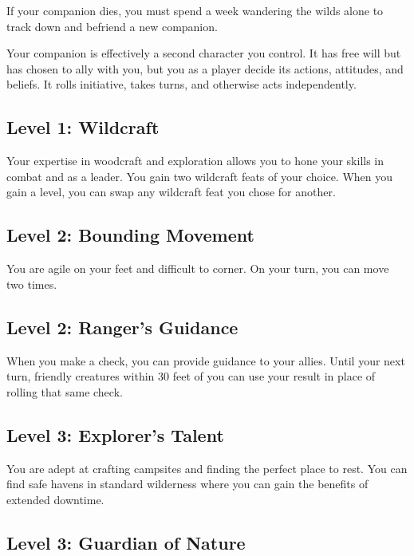 \documentclass[12pt,letterpaper,twocolumn,openany,nodeprecatedcode,bg=none]{dndbook}
\begin{document}
If your companion dies, you must spend a week wandering the wilds alone
to track down and befriend a new companion.

Your companion is effectively a second character you control. It has
free will but has chosen to ally with you, but you as a player decide
its actions, attitudes, and beliefs. It rolls initiative, takes turns,
and otherwise acts independently.

\subsection{Level 1: Wildcraft}\label{level-1-wildcraft}

Your expertise in woodcraft and exploration allows you to hone your
skills in combat and as a leader. You gain two wildcraft feats of your
choice. When you gain a level, you can swap any wildcraft feat you chose
for another.

\subsection{Level 2: Bounding Movement}\label{level-2-bounding-movement}

You are agile on your feet and difficult to corner. On your turn, you
can move two times.

\subsection{Level 2: Ranger's Guidance}\label{level-2-rangers-guidance}

When you make a check, you can provide guidance to your allies. Until
your next turn, friendly creatures within 30 feet of you can use your
result in place of rolling that same check.

\subsection{Level 3: Explorer's Talent}\label{level-3-explorers-talent}

You are adept at crafting campsites and finding the perfect place to
rest. You can find safe havens in standard wilderness where you can gain
the benefits of extended downtime.

\subsection{Level 3: Guardian of
Nature}\label{level-3-guardian-of-nature}
\end{document}
